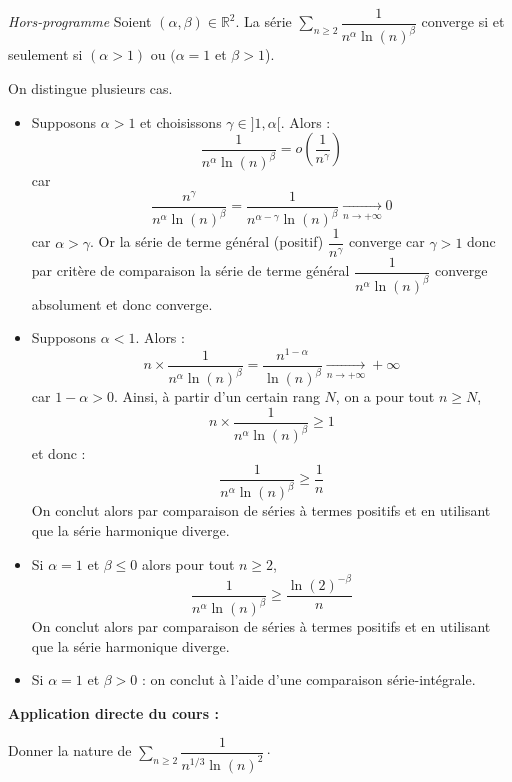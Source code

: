 \documentclass[french,11pt,twoside]{VcCours}
\newenvironment{ApplicationDirecte}{\textbf{Application directe du cours :}

}{}
\newcommand{\Sum}[2]{\ensuremath{\textstyle{\sum\limits_{#1}^{#2}}}}
\begin{document}
\begin{Proposition}{\emph{Hors-programme}} 
Soient $(\alpha, \beta) \in \mathbb{R}^2$. La série $\Sum{n \geq 2}{} \dfrac{1}{n^{\alpha} \ln(n)^{\beta}}$ converge si et seulement si $(\alpha > 1)$ ou $(\alpha = 1$ et $\beta >1$).
\end{Proposition}

\begin{Demonstration}{} On distingue plusieurs cas.

\begin{itemize}
\item Supposons $\alpha>1$ et choisissons $\gamma \in ]1, \alpha[$. Alors :
$$ \dfrac{1}{n^{\alpha} \ln(n)^{\beta}} = o \left( \frac{1}{n^{\gamma}} \right) $$
car 
$$ \dfrac{n^{\gamma}}{n^{\alpha} \ln(n)^{\beta}} = \dfrac{1}{n^{\alpha- \gamma} \ln(n)^{\beta}} \underset{n \rightarrow + \infty}{\rightarrow} 0$$
car $\alpha> \gamma$. Or la série de terme général (positif) $\dfrac{1}{n^{\gamma}}$ converge car $\gamma>1$ donc par critère de comparaison la série de terme général $\dfrac{1}{n^{\alpha} \ln(n)^{\beta}}$ converge absolument et donc converge.
\item Supposons $\alpha<1$. Alors :
$$ n \times \dfrac{1}{n^{\alpha} \ln(n)^{\beta}} = \dfrac{n^{1-\alpha}}{\ln(n)^{\beta}}  \underset{n \rightarrow + \infty}{\rightarrow} + \infty$$
car $1- \alpha>0$. Ainsi, à partir d'un certain rang $N$, on a pour tout $n \geq N$,
$$ n \times \dfrac{1}{n^{\alpha} \ln(n)^{\beta}} \geq 1$$
et donc :
$$ \dfrac{1}{n^{\alpha} \ln(n)^{\beta}} \geq \frac{1}{n}$$
On conclut alors par comparaison de séries à termes positifs et en utilisant que la série harmonique diverge.
\item Si $\alpha = 1$ et $\beta \leq 0$ alors pour tout $n \geq 2$,
$$ \dfrac{1}{n^{\alpha} \ln(n)^{\beta}} \geq \dfrac{\ln(2)^{- \beta}}{n}$$
On conclut alors par comparaison de séries à termes positifs et en utilisant que la série harmonique diverge.
\item Si $\alpha =1$ et $\beta >0$ : on conclut à l'aide d'une comparaison série-intégrale.
\end{itemize}

\end{Demonstration}




\begin{ApplicationDirecte} Donner la nature de $\Sum{n \geq 2}{} \dfrac{1}{n^{1/3} \ln(n)^2} \cdot$
\end{ApplicationDirecte} 
\end{document}
